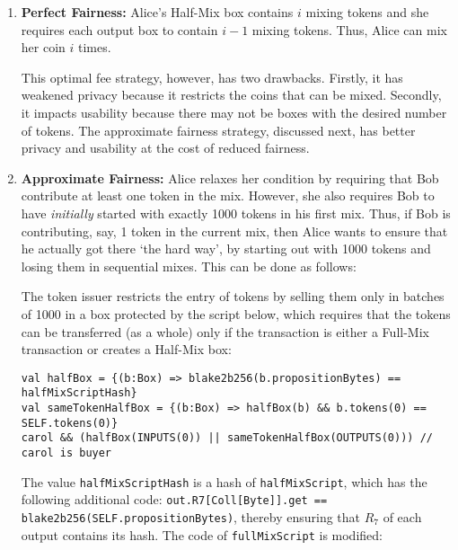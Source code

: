 \documentclass[11pt]{article}
\begin{document}
\begin{enumerate}
	\item \textbf{Perfect Fairness:} 
 Alice's Half-Mix box contains $i$ mixing tokens and she requires each output box to contain $i-1$ mixing tokens. Thus, Alice can mix her coin $i$ times. 
 
 This optimal fee strategy, however, has two drawbacks. Firstly, it has weakened privacy because it restricts the coins that can be mixed. Secondly, it impacts usability because there may not be boxes with the desired number of tokens. The approximate fairness strategy, discussed next, has better privacy and usability at the cost of reduced fairness.
 
 \item \textbf{Approximate Fairness:} Alice relaxes her condition by requiring that Bob contribute at least one token in the mix. %
 However, 
she also requires Bob to have {\em initially} started with exactly 1000 tokens in his first mix. Thus, if Bob is contributing, say, 1 token in the current mix, then Alice wants to ensure that he actually got there `the hard way', by starting out with 1000 tokens and losing them in sequential mixes. %
This can be done as follows:

The token issuer restricts the entry of tokens by selling them only in batches of 1000 in a box protected by the script below,
which requires that the tokens can be transferred (as a whole) only if the transaction is either a Full-Mix transaction or creates a Half-Mix box: 
\begin{verbatim}
val halfBox = {(b:Box) => blake2b256(b.propositionBytes) == halfMixScriptHash}
val sameTokenHalfBox = {(b:Box) => halfBox(b) && b.tokens(0) == SELF.tokens(0)}
carol && (halfBox(INPUTS(0)) || sameTokenHalfBox(OUTPUTS(0))) // carol is buyer
\end{verbatim}

The value \texttt{halfMixScriptHash} is a hash of \texttt{halfMixScript}, which has the following additional code: 
\texttt{out.R7[Coll[Byte]].get == blake2b256(SELF.propositionBytes)}, thereby ensuring that $R_7$ of each output contains its hash. The code of \texttt{fullMixScript} is modified:


\end{enumerate}
\end{document}
